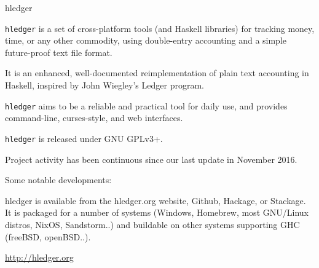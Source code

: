 \begin{hcarentry}[updated]{hledger}
\label{hledger}
\makeheader

{\tt hledger} is a set of cross-platform tools (and Haskell libraries) for
tracking money, time, or any other commodity, using double-entry accounting
and a simple future-proof text file format.

It is an enhanced, well-documented reimplementation of plain text accounting
in Haskell, inspired by John Wiegley's Ledger program.

{\tt hledger} aims to be a reliable and practical tool for daily use, and
provides command-line, curses-style, and web interfaces.

{\tt hledger} is released under GNU GPLv3+.

Project activity has been continuous since our last update in November 2016.

Some notable developments:

\begin{compactitem}
\end{compactitem}

hledger is available from the hledger.org website, Github, Hackage, or
Stackage. It is packaged for a number of systems (Windows, Homebrew, most
GNU/Linux distros, NixOS, Sandstorm..) and buildable on other systems
supporting GHC (freeBSD, openBSD..).

\FurtherReading
  \url{http://hledger.org}
\end{hcarentry}
